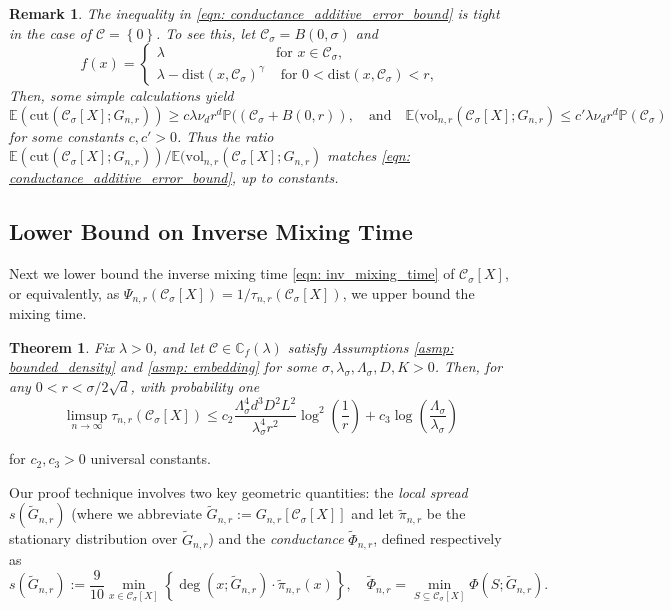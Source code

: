 \documentclass{article}
\newcommand{\set}[1]{\left\{#1\right\}}
\newcommand{\vol}{\mathrm{vol}}
\newcommand{\cut}{\mathrm{cut}}
\newcommand{\1}{\mathbf{1}}
\newcommand{\dist}{\mathrm{dist}}
\newcommand{\Xbf}{X}             %
\newcommand{\Pbb}{\mathbb{P}}
\newcommand{\Cbb}{\mathbb{C}}
\newcommand{\Ebb}{\mathbb{E}}
\newcommand{\Cset}{\mathcal{C}}
\newcommand{\Csig}{\Cset_{\sigma}}
\theoremstyle{aldenthm}
\newtheorem{theorem}{Theorem}
\theoremstyle{aldenrmrk}
\newtheorem{remark}{Remark}
\begin{document}
\begin{remark}
The inequality in \eqref{eqn: conductance_additive_error_bound} is tight in the case of $\Cset = \set{0}$. To see this, let $\Csig = B(0,\sigma)$ and
$$
 f(x)  = \begin{cases}
   \lambda &\text{for $x \in \Csig$}, \\
   \lambda - \dist(x,\Csig)^{\gamma} & \text{ for $0 < \dist(x,\Csig) < r$}, 
\end{cases}
$$
Then, some simple calculations yield
\begin{equation*}
\Ebb(\cut(\Csig[\Xbf]; G_{n,r})) \geq c \lambda \nu_d r^d \Pbb((\Csig + B(0,r)), \quad \textrm{and} \quad \Ebb(\vol_{n,r}(\Csig[\Xbf]; G_{n,r}) \leq c' \lambda \nu_d r^d \Pbb(\Csig)
\end{equation*}
for some constants $c,c' > 0$. Thus the ratio $\Ebb(\cut(\Csig[\Xbf]; G_{n,r})) / \Ebb(\vol_{n,r}(\Csig[\Xbf]; G_{n,r})$ matches \eqref{eqn: conductance_additive_error_bound}, up to constants.


\end{remark}

\subsection{Lower Bound on Inverse Mixing Time}

Next we lower bound the inverse mixing time \eqref{eqn: inv_mixing_time} of $\Csig[\Xbf]$, or equivalently, as $\Psi_{n,r}(\Csig[\Xbf]) = 1/\tau_{n,r}(\Csig[\Xbf])$, we upper bound the mixing time.

\begin{theorem}
	\label{thm: mixing_time_upper_bound}
	Fix $\lambda > 0$, and let $\Cset \in \Cbb_f(\lambda)$ satisfy Assumptions \ref{asmp: bounded_density} and \ref{asmp: embedding} for some $\sigma, \lambda_{\sigma}, \Lambda_{\sigma}, D, K > 0$. Then, for any $0 < r < \sigma/2\sqrt{d}$, with probability one
	\begin{equation}
	\label{eqn: mixing_time_upper_bound}
	\limsup_{n \to \infty}\tau_{n,r}(\Csig[\Xbf]) \leq c_2 \frac{\Lambda_{\sigma}^4 d^3 D^2 L^2}{\lambda_{\sigma}^4 r^2} \log^2\left(\frac{1}{r}\right) + c_3 \log\left(\frac{\Lambda_{\sigma}}{\lambda_{\sigma}}\right)
	\end{equation}
\end{theorem}
for $c_2,c_3 > 0$ universal constants. 

Our proof technique involves two key geometric quantities: the \emph{local spread} $s(\widetilde{G}_{n,r})$ (where we abbreviate $\widetilde{G}_{n,r} := G_{n,r}[\Csig[\Xbf]]$ and let $\widetilde{\pi}_{n,r}$ be the stationary distribution over $\widetilde{G}_{n,r}$) and the \emph{conductance} $\widetilde{\Phi}_{n,r}$, defined respectively as
\begin{equation}
\label{eqn: local_spread_and_conductance}
s(\widetilde{G}_{n,r}) := \frac{9}{10} \min_{x \in \Csig[\Xbf]} \set{\deg(x; \widetilde{G}_{n,r}) \cdot \widetilde{\pi}_{n,r}(x) }, \quad \widetilde{\Phi}_{n,r} = \min_{S \subseteq \Csig[\Xbf]} \Phi(S; \widetilde{G}_{n,r}).
\end{equation} 
\end{document}

